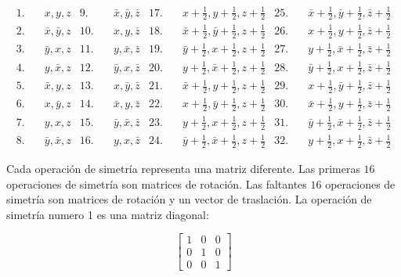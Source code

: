 \begin{align*}
        1.\quad& x,y,z                  & 9.\quad& \bar{x},\bar{y},\bar{z}  & 17.\quad& x+\frac{1}{2},y+\frac{1}{2},z+\frac{1}{2}   & 25.\quad& \bar{x}+\frac{1}{2},\bar{y}+\frac{1}{2},\bar{z}+\frac{1}{2}\\
        2.\quad& \bar{x},\bar{y},z      & 10.\quad& x,y,\bar{z}             & 18.\quad& \bar{x}+\frac{1}{2},\bar{y}+\frac{1}{2},z+\frac{1}{2}      & 26.\quad& x+\frac{1}{2},y+\frac{1}{2},\bar{z}+\frac{1}{2}\\
        3.\quad& \bar{y},x,z            & 11.\quad& y,\bar{x},\bar{z}       & 19.\quad& \bar{y}+\frac{1}{2},x+\frac{1}{2},z+\frac{1}{2}            & 27.\quad& y+\frac{1}{2},\bar{x}+\frac{1}{2},\bar{z}+\frac{1}{2} \\
        4.\quad& y,\bar{x},z            & 12.\quad& \bar{y},x,\bar{z}       & 20.\quad& y+\frac{1}{2},\bar{x}+\frac{1}{2},z+\frac{1}{2}            & 28.\quad& \bar{y}+\frac{1}{2},x+\frac{1}{2},\bar{z}+\frac{1}{2} \\
        5.\quad& \bar{x},y,z            & 13.\quad& x,\bar{y},\bar{z}       & 21.\quad& \bar{x}+\frac{1}{2},y+\frac{1}{2},z+\frac{1}{2}            & 29.\quad& x+\frac{1}{2},\bar{y}+\frac{1}{2},\bar{z}+\frac{1}{2} \\
        6.\quad& x,\bar{y},z            & 14.\quad& \bar{x},y,\bar{z}       & 22.\quad& x+\frac{1}{2},\bar{y}+\frac{1}{2},z+\frac{1}{2}            & 30.\quad& \bar{x}+\frac{1}{2},y+\frac{1}{2},\bar{z}+\frac{1}{2}\\
        7.\quad& y,x,z                  & 15.\quad& \bar{y},\bar{x},\bar{z} & 23.\quad& y+\frac{1}{2},x+\frac{1}{2},z+\frac{1}{2}                  & 31.\quad& \bar{y}+\frac{1}{2},\bar{x}+\frac{1}{2},\bar{z}+\frac{1}{2}   \\
        8.\quad& \bar{y},\bar{x},z      & 16.\quad& y,x,\bar{z}             & 24.\quad& \bar{y}+\frac{1}{2},\bar{x}+\frac{1}{2},z+\frac{1}{2}      & 32.\quad& y+\frac{1}{2},x+\frac{1}{2},\bar{z}+\frac{1}{2}       
\end{align*}


Cada operación de simetría representa una matriz diferente. Las primeras $16$ operaciones de simetría son matrices de rotación. Las faltantes $16$ operaciones de simetría son matrices de rotación y un vector de traslación. La operación de simetría numero 1 es una matriz diagonal:

\begin{equation*}
    \begin{bmatrix}
     1& 0 &0 \\ 
     0& 1 & 0\\ 
     0& 0 & 1
    \end{bmatrix} 
\end{equation*} 

